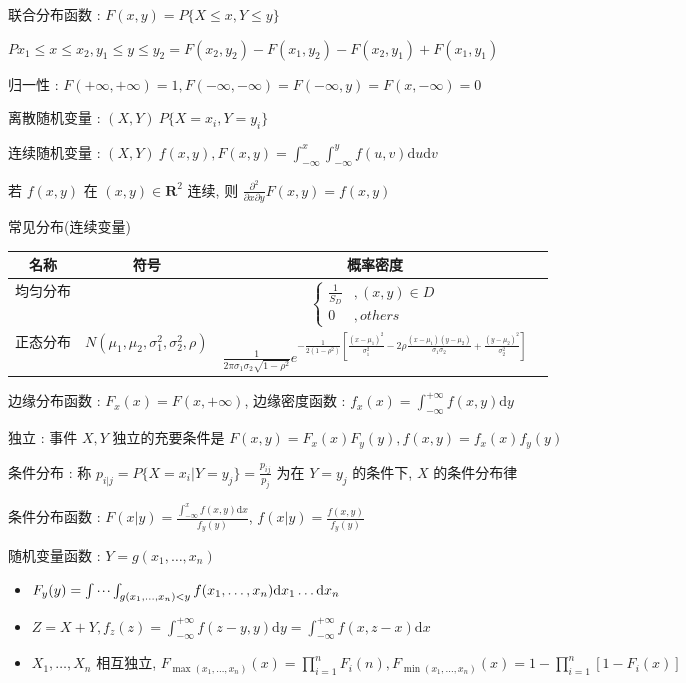 \documentclass[UTF8, 12pt]{ctexart}
\begin{document}
	
	联合分布函数 : $ F(x, y) = P\{X \leq x, Y \leq y\} $

	$ P{x_{1} \leq x \leq x_{2}, y_{1} \leq y \leq y_{2}} = F(x_{2}, y_{2}) - F(x_{1}, y_{2}) - F(x_{2}, y_{1}) + F(x_{1}, y_{1}) $

	归一性 : $ F(+\infty, +\infty) = 1, F(-\infty, -\infty) = F(-\infty, y) = F(x, -\infty) = 0 $

	离散随机变量 : $ (X, Y) ~ P\{X = x_{i}, Y = y_{i}\} $

	连续随机变量 : $ (X, Y) ~ f(x, y) , F(x, y) = \int_{-\infty}^{x}\int_{-\infty}^{y}f(u, v)\mathrm{d}u\mathrm{d}v $

	若 $ f(x, y) $ 在 $ (x, y) \in \mathbf{R}^{2} $ 连续, 则 $ \frac{\partial^2}{\partial x \partial y}F(x, y) = f(x, y) $

	常见分布(连续变量)
	\begin{table}[ht]
		\begin{tabular}{|c|c|c|c|}
			\hline
			名称 & 符号 & 概率密度 \\ \hline
			均匀分布 & & $ \begin{cases} \frac{1}{S_{D}}&, (x, y) \in D \\ 0&, others \end{cases} $ \\ \hline
			正态分布 & $ N(\mu_{1}, \mu_{2}, \sigma_{1}^{2}, \sigma_{2}^{2}, \rho) $ & 
			$ \frac{1}{2\pi\sigma_{1}\sigma_{2}\sqrt{1-\rho^{2}}}e^{-\frac{1}{2(1-\rho^{2})}[\frac{(x-\mu_{1})^{2}}{\sigma_{1}^{2}} - 2\rho\frac{(x-\mu_{1})(y-\mu_{2})}{\sigma_{1}\sigma_{2}} + \frac{(y-\mu_{2})^{2}}{\sigma_{2}^{2}}]} $ \\ \hline
		\end{tabular}
	\end{table}

	边缘分布函数 : $ F_{x}(x) = F(x, +\infty) $, 边缘密度函数 : $ f_{x}(x) = \int_{-\infty}^{+\infty}f(x, y)\mathrm{d}y $

	独立 : 事件 $ X, Y $ 独立的充要条件是 $ F(x, y) = F_{x}(x)F_{y}(y) , f(x, y) = f_{x}(x)f_{y}(y) $

	条件分布 : 称 $ p_{i|j} = P\{X = x_{i}|Y = y_{j}\} = \frac{p_{ij}}{p_{\dot j}} $ 为在 $ Y = y_{j} $ 的条件下, $ X $ 的条件分布律

	条件分布函数 : $ F(x|y) = \frac{\int_{-\infty}^{x}f(x, y)\mathrm{d}x}{f_{y}(y)} $, $ f(x|y) = \frac{f(x, y)}{f_{y}(y)} $

	随机变量函数 : $ Y = g(x_{1}, \dots, x_{n}) $
	\begin{itemize}[leftmargin = 4em]
		\item $ F_{y}(y) = \idotsint_{g(x_{1}, \dots, x_{n}) < y}f(x_{1}, \dots, x_{n})\mathrm{d}x_{1}\dots\mathrm{d}x_{n} $
		\item $ Z = X + Y , f_{z}(z) = \int_{-\infty}^{+\infty}f(z-y, y)\mathrm{d}y = \int_{-\infty}^{+\infty}f(x, z-x)\mathrm{d}x $
		\item $ X_{1}, \dots, X_{n} $ 相互独立, $ F_{\max(x_{1}, \dots, x_{n})}(x) = \prod\limits_{i=1}^{n}F_{i}(n), F_{\min(x_{1}, \dots, x_{n})}(x) = 1 - \prod\limits_{i=1}^{n}[1-F_{i}(x)] $
	\end{itemize}
 
\end{document}
